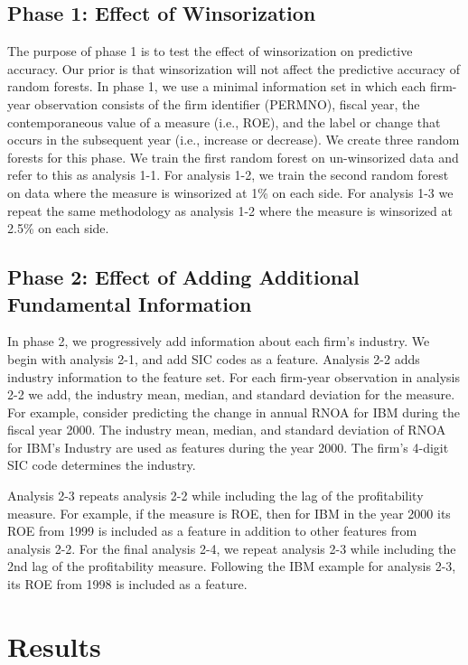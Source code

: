 \subsection{Phase 1: Effect of Winsorization}

The purpose of phase 1 is to test the effect of winsorization on predictive accuracy.  Our prior is that winsorization will not affect the predictive accuracy of random forests.  In phase 1, we use a minimal information set in which each firm-year observation consists of the firm identifier (PERMNO), fiscal year, the contemporaneous value of a measure (i.e., ROE), and the label or change that occurs in the subsequent year (i.e., increase or decrease). We create three random forests for this phase.  We train the first random forest on un-winsorized data and refer to this as analysis 1-1.  For analysis 1-2, we train the second random forest on data where the measure is winsorized at 1\% on each side. For analysis 1-3 we repeat the same methodology as analysis 1-2 where the measure is winsorized at 2.5\% on each side.

\subsection{Phase 2: Effect of Adding Additional Fundamental Information}
In phase 2, we progressively add information about each firm's industry.  We begin with analysis 2-1, and add SIC codes as a feature.  Analysis 2-2 adds industry information to the feature set.  For each firm-year observation in analysis 2-2 we add,  the industry mean, median, and standard deviation for the measure. For example, consider predicting the change in annual RNOA for IBM during the fiscal year 2000.  The industry mean, median, and standard deviation of RNOA for IBM's Industry are used as features during the year 2000.  The firm's 4-digit SIC code determines the industry.

Analysis 2-3 repeats analysis 2-2 while including the lag of the profitability measure.  For example, if the measure is ROE, then for IBM in the year 2000 its ROE from 1999 is included as a feature in addition to other features from analysis 2-2.  For the final analysis 2-4,  we repeat analysis 2-3 while including the 2nd lag of the profitability measure.  Following the IBM example for analysis 2-3, its ROE from 1998 is included as a feature.

\section{Results}

